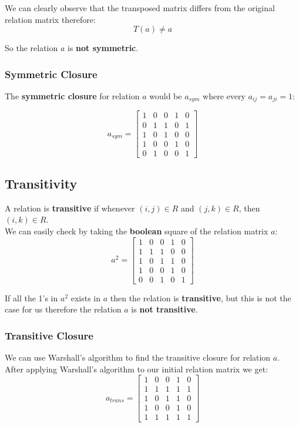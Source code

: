 \documentclass[11pt]{article}
\begin{document}
We can clearly observe that the transposed matrix differs from the original relation matrix therefore:
\[
T(a) \neq a
\]

So the relation \(a\) is \textbf{not symmetric}.
\subsubsection{Symmetric Closure}
\label{sec:orga50b029}
The \textbf{symmetric closure} for relation \(a\) would be \(a_{sym}\) where every \(a_{ij} = a_{ji} = 1\):

\[
a_{sym} =
 \begin{bmatrix}
 1 & 0 & 0 & 1 & 0 \\
 0 & 1 & 1 & 0 & 1 \\
 1 & 0 & 1 & 0 & 0 \\
 1 & 0 & 0 & 1 & 0 \\
 0 & 1 & 0 & 0 & 1
 \end{bmatrix}
\]
\subsection{Transitivity}
\label{sec:org424414c}
A relation is \textbf{transitive} if whenever \((i,j) \in R\) and \((j, k) \in R\), then \((i,k) \in R\). \\
We can easily check by taking the \textbf{boolean} square of the relation matrix \(a\):
\[
a^2 =
 \begin{bmatrix}
 1 & 0 & 0 & 1 & 0 \\
 1 & 1 & 1 & 0 & 0 \\
 1 & 0 & 1 & 1 & 0 \\
 1 & 0 & 0 & 1 & 0 \\
 0 & 0 & 1 & 0 & 1
 \end{bmatrix}
\]

If all the 1's in \(a^2\) exists in \(a\) then the relation is \textbf{transitive}, but this is not the case for us therefore the relation \(a\) is \textbf{not transitive}.
\subsubsection{Transitive Closure}
\label{sec:orgcee18f0}
We can use Warshall's algorithm to find the transitive closure for relation \(a\).
After applying Warshall's algorithm to our initial relation matrix we get:
\[
a_{trans} =
\begin{bmatrix}
1 & 0 & 0 & 1 & 0 \\
1 & 1 & 1 & 1 & 1 \\
1 & 0 & 1 & 1 & 0 \\
1 & 0 & 0 & 1 & 0 \\
1 & 1 & 1 & 1 & 1
\end{bmatrix}
\]
\end{document}
